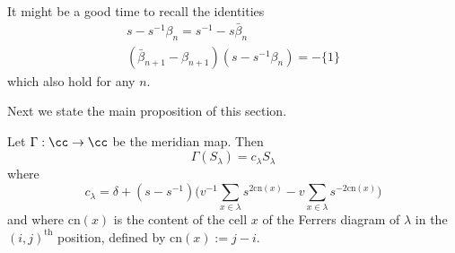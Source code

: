 It might be a good time to recall the identities
\begin{gather*}
s - s^{-1}\beta_n = s^{-1} - s\bar{\beta}_n \\
\left( \bar{\beta}_{n+1} - \beta_{n+1} \right) \left( s-s^{-1}\beta_n \right) = - \{1\}
\end{gather*}
which also hold for any $n$.

Next we state the main proposition of this section.
\begin{proposition} \label{prop:schureigenvalues}
Let $\Gamma: \cc \to \cc$ be the meridian map. Then
\begin{equation}
\Gamma ( S_\lambda ) = c_\lambda S_\lambda
\end{equation}
where
\begin{equation}
c_\lambda = \delta + ( s - s^{-1} ) \Big( v^{-1} \sum_{x \in \lambda} s^{2 \textrm{cn}(x)} - v \sum_{x \in \lambda} s^{-2 \textrm{cn}(x)} \Big)
\end{equation}
and where $\textrm{cn}(x)$ is the content of the cell $x$ of the Ferrers diagram of $\lambda$ in the $(i,j)^{\textrm{th}}$ position, defined by $\textrm{cn}(x) := j-i$.
\end{proposition}
